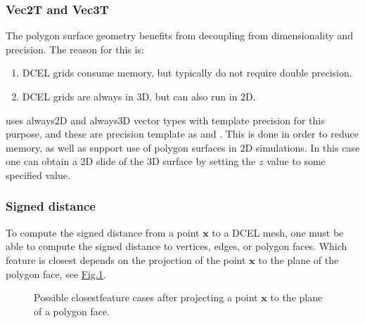 \documentclass[letterpaper,10pt,english]{sphinxmanual}
\let\sphinxpxdimen\pdfpxdimen\else\newdimen\sphinxpxdimen
\begin{document}
\subsubsection{Vec2T and Vec3T}
\label{\detokenize{Utilities/ComplexGeometries:vec2t-and-vec3t}}
The polygon surface geometry benefits from decoupling from  dimensionality and precision.
The reason for this is:
\begin{enumerate}
%
\item {} 
DCEL grids consume memory, but typically do not require double precision.

\item {} 
DCEL grids are always in 3D, but  can also run in 2D.

\end{enumerate}

 uses always\sphinxhyphen{}2D and always\sphinxhyphen{}3D vector types with template precision for this purpose, and these are precision template as  and .
This is done in order to reduce memory, as well as support use of polygon surfaces in 2D simulations.
In this case one can obtain a 2D slide of the 3D surface by setting the \(z\) value to some specified value.


\subsubsection{Signed distance}
\label{\detokenize{Utilities/ComplexGeometries:signed-distance}}\label{\detokenize{Utilities/ComplexGeometries:chap-dceldistance}}
To compute the signed distance from a point \(\mathbf{x}\) to a DCEL mesh, one must be able to compute the signed distance to vertices, edges, or polygon faces.
Which feature is closest depends on the projection of the point \(\mathbf{x}\) to the plane of the polygon face, see \hyperref[\detokenize{Utilities/ComplexGeometries:fig-polygonprojection}]{Fig.\@ \ref{\detokenize{Utilities/ComplexGeometries:fig-polygonprojection}}}.

\begin{figure}[htb]
\centering
\capstart

\noindent\sphinxincludegraphics[width=240\sphinxpxdimen]{{PolygonProjection}.png}
\caption{Possible closest\sphinxhyphen{}feature cases after projecting a point \(\mathbf{x}\) to the plane of a polygon face.}\label{\detokenize{Utilities/ComplexGeometries:id3}}\label{\detokenize{Utilities/ComplexGeometries:fig-polygonprojection}}\end{figure}
\end{document}
